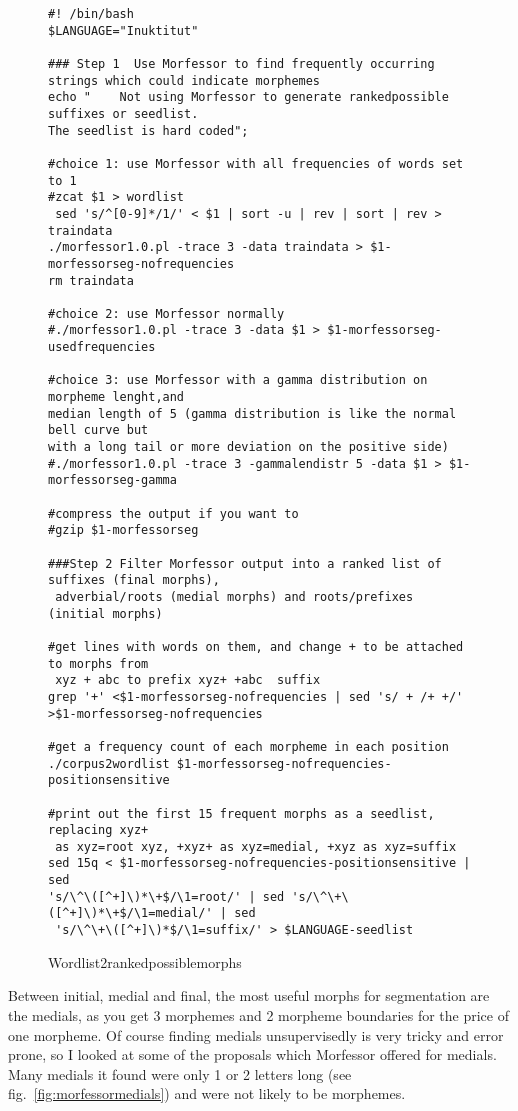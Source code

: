 \documentclass[runningheads,a4paper]{llncs}
\begin{document}
\begin{figure*}
\begin{verbatim}
#! /bin/bash
$LANGUAGE="Inuktitut"

### Step 1  Use Morfessor to find frequently occurring strings which could indicate morphemes
echo "    Not using Morfessor to generate rankedpossible suffixes or seedlist. 
The seedlist is hard coded";

#choice 1: use Morfessor with all frequencies of words set to 1
#zcat $1 > wordlist
 sed 's/^[0-9]*/1/' < $1 | sort -u | rev | sort | rev > traindata
./morfessor1.0.pl -trace 3 -data traindata > $1-morfessorseg-nofrequencies
rm traindata

#choice 2: use Morfessor normally
#./morfessor1.0.pl -trace 3 -data $1 > $1-morfessorseg-usedfrequencies

#choice 3: use Morfessor with a gamma distribution on morpheme lenght,and 
median length of 5 (gamma distribution is like the normal bell curve but 
with a long tail or more deviation on the positive side)
#./morfessor1.0.pl -trace 3 -gammalendistr 5 -data $1 > $1-morfessorseg-gamma

#compress the output if you want to
#gzip $1-morfessorseg

###Step 2 Filter Morfessor output into a ranked list of suffixes (final morphs),
 adverbial/roots (medial morphs) and roots/prefixes (initial morphs)

#get lines with words on them, and change + to be attached to morphs from
 xyz + abc to prefix xyz+ +abc  suffix
grep '+' <$1-morfessorseg-nofrequencies | sed 's/ + /+ +/' >$1-morfessorseg-nofrequencies

#get a frequency count of each morpheme in each position
./corpus2wordlist $1-morfessorseg-nofrequencies-positionsensitive

#print out the first 15 frequent morphs as a seedlist, replacing xyz+ 
 as xyz=root xyz, +xyz+ as xyz=medial, +xyz as xyz=suffix
sed 15q < $1-morfessorseg-nofrequencies-positionsensitive | sed
's/\^\([^+]\)*\+$/\1=root/' | sed 's/\^\+\([^+]\)*\+$/\1=medial/' | sed
 's/\^\+\([^+]\)*$/\1=suffix/' > $LANGUAGE-seedlist
\end{verbatim}
	\caption{Wordlist2rankedpossiblemorphs}
	\label{fig:Wordlist2rankedpossiblemorphs}
\end{figure*}

Between initial, medial and final, the most useful morphs for segmentation are the medials, as you get 3 morphemes and 2 morpheme boundaries for the price of one morpheme. Of course finding medials unsupervisedly is very tricky and error prone, so I looked at some of the proposals which Morfessor offered for medials. Many medials it found were only 1 or 2 letters long (see fig.~\ref{fig:morfessormedials}) and were not likely to be morphemes. 
\end{document}
